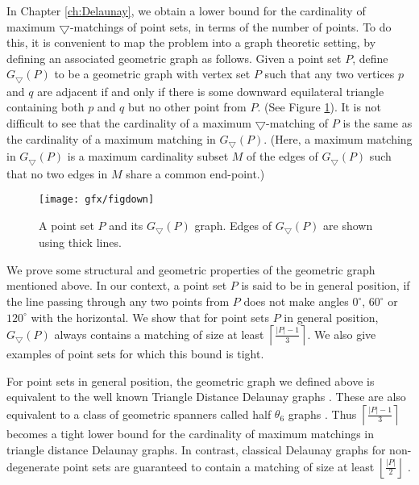 In Chapter \ref{ch:Delaunay}, we obtain a lower bound for the cardinality of maximum $\bigtriangledown$-matchings of point sets, 
in terms of the number of points. To do this, it is convenient to map the problem into a graph theoretic setting, by defining an associated geometric graph as follows.  
Given a point set $P$, define $G_{\bigtriangledown}(P)$ to be a geometric graph with vertex set $P$ such that any two vertices $p$ and $q$ are adjacent 
if and only if there is some downward equilateral triangle containing both $p$ and $q$ but no other point from $P$. 
(See Figure \ref{Figdowngraph}). It is not difficult to see that the cardinality of a maximum $\bigtriangledown$-matching of $P$
is the same as the cardinality of a maximum matching in $G_{\bigtriangledown}(P)$. 
(Here, a maximum matching in $G_{\bigtriangledown}(P)$ is a maximum cardinality subset $M$ of the edges of $G_{\bigtriangledown}(P)$ such that no two edges 
in $M$ share a common end-point.)

\begin{figure}[h]
\centering
  \texttt{[image: gfx/figdown]}   %
  \caption{A point set $P$ and its $G_{\bigtriangledown}(P)$ graph. Edges of $G_{\bigtriangledown}(P)$ are shown using thick lines.}
\label{Figdowngraph}
  \end{figure}

We prove some structural and geometric properties of the geometric graph mentioned above. 
In our context, a point set $P$ is said to be in general position, if the line passing through any two points from $P$ does not 
make angles $0^\circ$, $60 ^\circ$ or $120^\circ$ with the horizontal. We show that 
for point sets $P$ in general position, $G_{\bigtriangledown}(P)$ always contains a matching of size at least 
$\left\lceil\frac{|P|-1}{3}\right\rceil$. We also give examples of point sets for which this bound is tight. 

For point sets in general position, the geometric graph we defined above is equivalent to the well known 
Triangle Distance Delaunay graphs \cite{Bonichon2010}. 
These are also equivalent to a class of geometric spanners called half $\theta_6$ graphs \cite{Bonichon2010}. 
Thus $\left\lceil\frac{|P|-1}{3}\right\rceil$ becomes a tight lower bound for the cardinality of maximum matchings in triangle distance Delaunay graphs.
In contrast, classical Delaunay graphs for non-degenerate point sets are guaranteed to contain a matching of size at 
least $\left\lfloor\frac{|P|}{2}\right\rfloor$ \cite{Dillencourt1990}.

